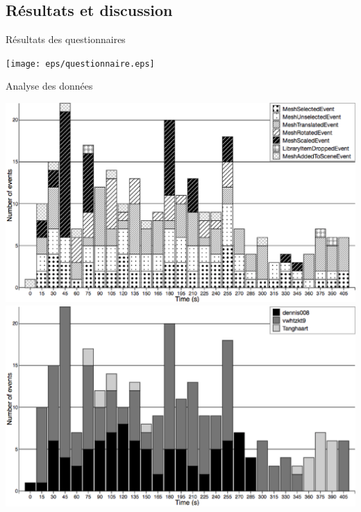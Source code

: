 \subsection{Résultats et discussion}
\begin{frame}{Résultats des questionnaires}

	\centering
	\texttt{[image: eps/questionnaire.eps]}


\end{frame}

\begin{frame}{Analyse des données}

	\includegraphics[width=0.8\textheight]{eps/byevents.eps}\\
\includegraphics[width=0.8\textheight]{eps/byuser.eps}

\end{frame}

